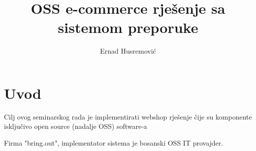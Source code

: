 \documentclass[times, utf8, seminar]{fit}
\begin{document}





\title{OSS e-commerce rješenje sa sistemom preporuke}

\author{Ernad Husremović}


\maketitle

\tableofcontents

\newpage

%
%


\chapter{Uvod}

Cilj ovog seminarskog rada je implementirati webshop rješenje čije su komponente isključivo open source (nadalje OSS) software-a 

Firma "bring.out", implementator sistema je bosanski OSS IT provajder.
\end{document}
